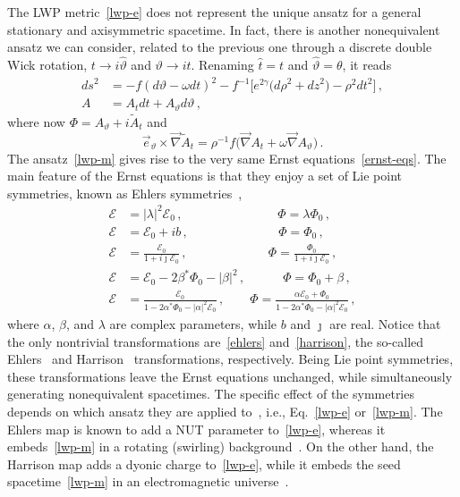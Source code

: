 \documentclass[aps,preprint,groupedaddress,nofootinbib,superscriptaddress,showkeys,showpacs,eqsecnum,amsmath,amssymb]{revtex4-1}
\newcommand{\ernst}{\mathcal{E}}
\begin{document}
The LWP metric~\eqref{lwp-e} does not represent the unique ansatz for a general stationary and axisymmetric spacetime. In fact, there is another nonequivalent ansatz we can consider, related to the previous one through a discrete double Wick rotation, $t \to i \hat{\vartheta}$ and $\vartheta \to i\hat{t}$. Renaming $\hat{t}=t$ and $\hat{\vartheta}=\theta$, it reads 
\begin{subequations}
\label{lwp-m}
\begin{align}
{ds}^2 & =
-f (d\vartheta - \omega dt)^2
- f^{-1} \bigl[ e^{2\gamma} \bigl( {d\rho}^2 + {dz}^2 \bigr)
- \rho^2 {dt}^2 \bigr] \,, \\
A & = A_t dt + A_\vartheta d\vartheta \,,
\end{align}
\end{subequations}
where now $\Phi = A_\vartheta+ i\tilde{A}_t$ and
\begin{equation}
\label{At}
\vec{e}_{\vartheta} \times \vec\nabla \tilde{A}_t =
\rho^{-1} f \bigl( \vec\nabla A_t + \omega \vec\nabla A_\vartheta \bigr) \,.
\end{equation}
The ansatz~\eqref{lwp-m} gives rise to the very same Ernst equations~\eqref{ernst-eqs}. The main feature of the 
Ernst equations is that they enjoy a set of Lie point symmetries, known as Ehlers symmetries~\cite{Stephani:2003tm},
\begin{subequations}
\label{ernst-group}
\begin{align}
\label{gauge1}
\ernst & = |\lambda|^2 \ernst_0 \,, \qquad\qquad\qquad\quad\;\;
\Phi = \lambda \Phi_0 \,, \\
\label{gauge2}
\ernst & = \ernst_0 + ib \,, \qquad\qquad\qquad\quad\,
\Phi = \Phi_0 \,, \\
\label{ehlers}
\ernst & = \frac{\ernst_0}{1 + i\jmath\ernst_0} \,, \qquad\qquad\qquad\;\,
\Phi = \frac{\Phi_0}{1 + i\jmath\ernst_0} \,, \\
\label{gauge3}
\ernst & = \ernst_0 - 2\beta^*\Phi_0 - |\beta|^2 \,, \qquad\quad\!
\Phi = \Phi_0 + \beta \,, \\
\label{harrison}
\ernst & = \frac{\ernst_0}{1 - 2\alpha^*\Phi_0 - |\alpha|^2\ernst_0} \,, \qquad
\Phi = \frac{\alpha\ernst_0 + \Phi_0}{1 - 2\alpha^*\Phi_0 - |\alpha|^2\ernst_0} \,,
\end{align}
\end{subequations}
where $\alpha$, $\beta$, and $\lambda$ are complex parameters, while $b$ and $\jmath$ are real.
Notice that the only nontrivial transformations are~\eqref{ehlers} and~\eqref{harrison}, the so-called Ehlers~\cite{Ehlers:1957zz} and Harrison~\cite{Harrison:1968} transformations, respectively. Being Lie point symmetries, these transformations leave the Ernst equations unchanged, while simultaneously generating nonequivalent spacetimes. The specific effect of the symmetries depends on which ansatz they are applied to~\cite{Vigano:2022hrg}, i.e., Eq.~\eqref{lwp-e} or~\eqref{lwp-m}. The Ehlers map is known to add a NUT parameter to~\eqref{lwp-e}, whereas it embeds~\eqref{lwp-m} in a rotating (swirling) background~\cite{Astorino:2022aam}. On the other hand, the Harrison map adds a dyonic charge to~\eqref{lwp-e}, while it embeds the seed spacetime~\eqref{lwp-m} in an electromagnetic universe~\cite{Ernst:1976mzr}.
\end{document}

